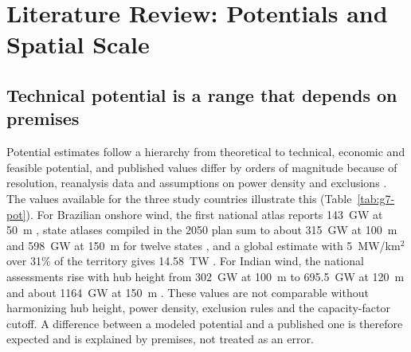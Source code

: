 
\section{Literature Review: Potentials and Spatial Scale}
\label{sec:g7-lit}

\subsection{Technical potential is a range that depends on premises}
Potential estimates follow a hierarchy from theoretical to technical, economic and feasible potential, and published values differ by orders of magnitude because of resolution, reanalysis data and assumptions on power density and exclusions \citep{angliviel2023}. The values available for the three study countries illustrate this (Table~\ref{tab:g7-pot}). For Brazilian onshore wind, the first national atlas reports 143~GW at 50~m \citep{amarante2001}, state atlases compiled in the 2050 plan sum to about 315~GW at 100~m and 598~GW at 150~m for twelve states \citep{epe2020pne}, and a global estimate with 5~MW/km$^2$ over 31\% of the territory gives 14.58~TW \citep{eurek2017}. For Indian wind, the national assessments rise with hub height from 302~GW at 100~m to 695.5~GW at 120~m and about 1164~GW at 150~m \citep{niwe_atlas}. These values are not comparable without harmonizing hub height, power density, exclusion rules and the capacity-factor cutoff. A difference between a modeled potential and a published one is therefore expected and is explained by premises, not treated as an error.

